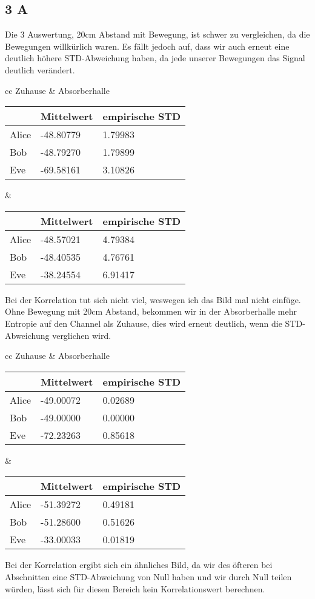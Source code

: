 \documentclass[12pt,a4paper]{article}
\begin{document}
\subsection*{3 A}
Die 3 Auswertung, 20cm Abstand mit Bewegung, ist schwer zu vergleichen, da die Bewegungen willkürlich waren. Es fällt jedoch auf, dass wir auch erneut eine deutlich höhere STD-Abweichung haben, da jede unserer Bewegungen das Signal deutlich verändert.
\begin{table}[H]
\centering
\begin{tabular}{ cc }
Zuhause & Absorberhalle  \\
\begin{tabular}{l|l|l}
& Mittelwert & empirische STD \\
\hline
Alice & -48.80779 & 1.79983 \\
\hline
Bob & -48.79270 & 1.79899 \\
\hline
Eve & -69.58161 & 3.10826 \\
\end{tabular} &
\begin{tabular}{l|l|l}
& Mittelwert & empirische STD \\
\hline
Alice & -48.57021 & 4.79384 \\
\hline
Bob & -48.40535 & 4.76761 \\
\hline
Eve & -38.24554 & 6.91417 \\
\end{tabular}
\end{tabular}
\end{table}
Bei der Korrelation tut sich nicht viel, weswegen ich das Bild mal nicht einfüge.\\
Ohne Bewegung mit 20cm Abstand, bekommen wir in der Absorberhalle mehr Entropie auf den Channel als Zuhause, dies wird erneut deutlich, wenn die STD-Abweichung verglichen wird.
\begin{table}[H]
\centering
\begin{tabular}{ cc }
Zuhause & Absorberhalle  \\
\begin{tabular}{l|l|l}
& Mittelwert & empirische STD \\
\hline
Alice & -49.00072 & 0.02689 \\
\hline
Bob & -49.00000 & 0.00000 \\
\hline
Eve & -72.23263 & 0.85618 \\
\end{tabular} &
\begin{tabular}{l|l|l}
& Mittelwert & empirische STD \\
\hline
Alice & -51.39272 & 0.49181 \\
\hline
Bob & -51.28600 & 0.51626 \\
\hline
Eve & -33.00033 & 0.01819 \\
\end{tabular}
\end{tabular}
\end{table}
Bei der Korrelation ergibt sich ein ähnliches Bild, da wir des öfteren bei Abschnitten eine STD-Abweichung von Null haben und wir durch Null teilen würden, lässt sich für diesen Bereich kein Korrelationswert berechnen.\\
\end{document}
